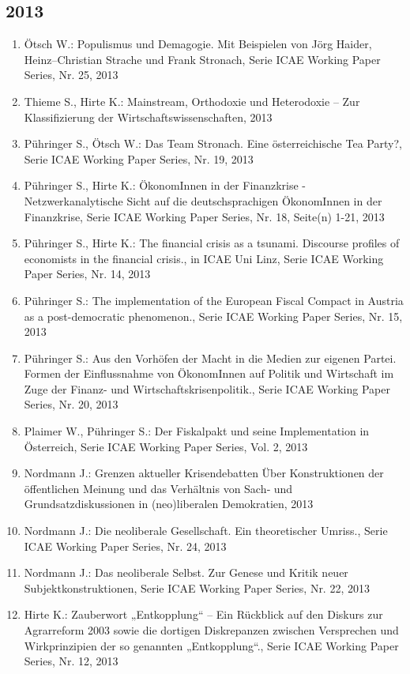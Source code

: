 \subsection*{2013}
\begin{enumerate}
    	 \item Ötsch W.: Populismus und Demagogie. Mit Beispielen von Jörg Haider, Heinz–Christian Strache und Frank Stronach, Serie ICAE Working Paper Series, Nr. 25, 2013
	 \item Thieme S., Hirte K.: Mainstream, Orthodoxie und Heterodoxie – Zur Klassifizierung der Wirtschaftswissenschaften, 2013
	 \item Pühringer S., Ötsch W.: Das Team Stronach. Eine österreichische Tea Party?, Serie ICAE Working Paper Series, Nr. 19, 2013
	 \item Pühringer S., Hirte K.: ÖkonomInnen in der Finanzkrise - Netzwerkanalytische Sicht auf die deutschsprachigen ÖkonomInnen in der Finanzkrise, Serie ICAE Working Paper Series, Nr. 18, Seite(n) 1-21, 2013
	 \item Pühringer S., Hirte K.: The financial crisis as a tsunami. Discourse profiles of economists in the financial crisis., in ICAE Uni Linz, Serie ICAE Working Paper Series, Nr. 14, 2013
	 \item Pühringer S.: The implementation of the European Fiscal Compact in Austria as a post-democratic phenomenon., Serie ICAE Working Paper Series, Nr. 15, 2013
	 \item Pühringer S.: Aus den Vorhöfen der Macht in die Medien zur eigenen Partei. Formen der Einflussnahme von ÖkonomInnen auf Politik und Wirtschaft im Zuge der Finanz-­ und Wirtschaftskrisenpolitik., Serie ICAE Working Paper Series, Nr. 20, 2013
	 \item Plaimer W., Pühringer S.: Der Fiskalpakt und seine Implementation in Österreich, Serie ICAE Working Paper Series, Vol. 2, 2013
	 \item Nordmann J.: Grenzen aktueller Krisendebatten Über Konstruktionen der öffentlichen Meinung und das Verhältnis von Sach‐ und Grundsatzdiskussionen in (neo)liberalen Demokratien, 2013
	 \item Nordmann J.: Die neoliberale Gesellschaft. Ein theoretischer Umriss., Serie ICAE Working Paper Series, Nr. 24, 2013
	 \item Nordmann J.: Das neoliberale Selbst. Zur Genese und Kritik neuer Subjektkonstruktionen, Serie ICAE Working Paper Series, Nr. 22, 2013
	 \item Hirte K.: Zauberwort „Entkopplung“ – Ein Rückblick auf den Diskurs zur Agrarreform 2003 sowie die dortigen Diskrepanzen zwischen Versprechen und Wirkprinzipien der so genannten „Entkopplung“., Serie ICAE Working Paper Series, Nr. 12, 2013

\end{enumerate}
